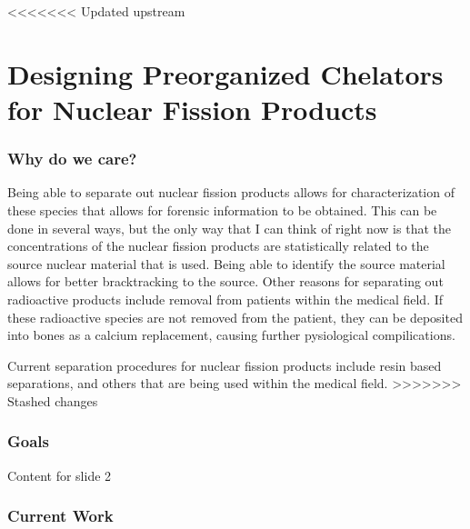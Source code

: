 <<<<<<< Updated upstream
\section{Designing Preorganized Chelators for Nuclear Fission Products}


\begin{frame}
\frametitle{Why do we care?}
Being able to separate out nuclear fission products allows for characterization of these species that allows for forensic information to be obtained. This can be done in several ways, but the only way that I can think of right now is
that the concentrations of the nuclear fission products are statistically related to the source nuclear material that is used. Being able to identify the source material allows for better bracktracking to the source. Other reasons for
separating out radioactive products include removal from patients within the medical field. If these radioactive species are not removed from the patient, they can be deposited into bones as a calcium replacement, causing further
pysiological compilications. 
\end{frame}

\begin{frame}
Current separation procedures for nuclear fission products include resin based separations, and others that are being used within the medical field. 
>>>>>>> Stashed changes
\end{frame}


\begin{frame}
\frametitle{Goals}
Content for slide 2
\end{frame}


\begin{frame}
\frametitle{Current Work}
\end{frame}
